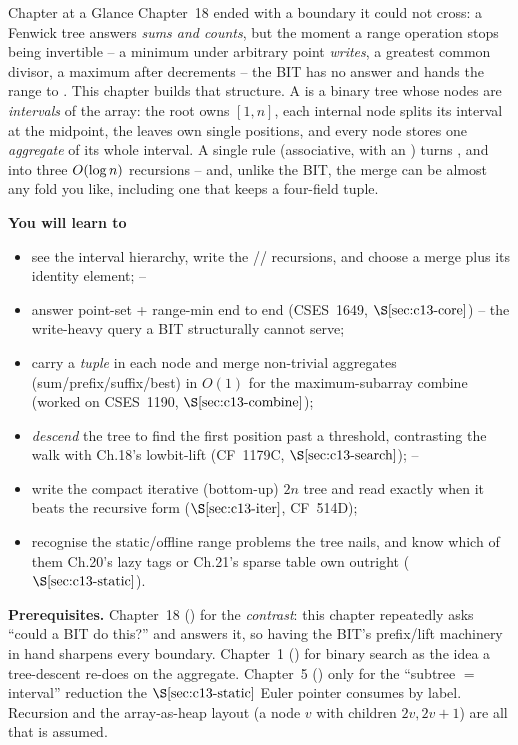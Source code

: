 \begin{chaptertheorybox}{Chapter at a Glance}
Chapter~18 ended with a boundary it could not cross: a Fenwick tree answers
\emph{sums and counts}, but the moment a range operation stops being
invertible -- a minimum under arbitrary point \emph{writes}, a greatest common
divisor, a maximum after decrements -- the BIT has no answer and hands the
range to .  This chapter builds that structure.  A  is a binary tree whose nodes are \emph{intervals} of the array: the root
owns \([1,n]\), each internal node splits its interval at the midpoint, the
leaves own single positions, and every node stores one \emph{aggregate} of its
whole interval.  A single  rule (associative, with an
) turns ,  and 
into three \(O(\log n)\) recursions -- and, unlike the BIT, the merge can
be almost any fold you like, including one that keeps a four-field tuple.

\textbf{You will learn to}
\begin{itemize}[nosep]
  \item see the interval hierarchy, write the //
         recursions, and choose a merge plus its identity element;
        \hfill{}--
  \item answer point-set + range-min end to end (CSES~1649, \(\secref{c13-core}\))
        -- the write-heavy query a BIT structurally cannot serve; \hfill{}
  \item carry a \emph{tuple} in each node and merge non-trivial aggregates
        (sum/prefix/suffix/best) in \(O(1)\) for the maximum-subarray combine
        (worked on CSES~1190, \(\secref{c13-combine}\)); \hfill{}
  \item \emph{descend} the tree to find the first position past a threshold,
        contrasting the walk with Ch.18's lowbit-lift (CF~1179C,
        \(\secref{c13-search}\)); \hfill{}--
  \item write the compact iterative (bottom-up) \(2n\) tree and read exactly
        when it beats the recursive form (\(\secref{c13-iter}\), CF~514D); \hfill{}
  \item recognise the static/offline range problems the tree nails, and know
        which of them Ch.20's lazy tags or Ch.21's sparse table own outright
        (\(\secref{c13-static}\)). \hfill{}
\end{itemize}

\textbf{Prerequisites.} Chapter~18 () for the \emph{contrast}: this
chapter repeatedly asks ``could a BIT do this?'' and answers it, so having the
BIT's prefix/lift machinery in hand sharpens every boundary.  Chapter~1
() for binary search as the idea a tree-descent re-does on the
aggregate.  Chapter~5 () only for the ``subtree \(=\) interval''
reduction the \(\secref{c13-static}\) Euler pointer consumes by label.  Recursion
and the array-as-heap layout (a node \(v\) with children \(2v,2v{+}1\)) are all
that is assumed.
\end{chaptertheorybox}

